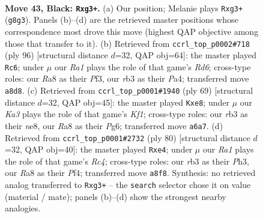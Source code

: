 \documentclass[11pt]{article}
\begin{document}
\clearpage

\begin{figure}[p]\centering
\begin{subfigure}{0.46\textwidth}\centering
\resizebox{\linewidth}{!}{%
\newchessgame
\chessboard[
  setfen={r5r1/5p1p/kpQ5/8/3P4/1R4PP/5P2/6K1 b - - 0 43},
  showmover=false,
  pgfstyle=straightmove, color=movearrow, markmove={g8-g3}
]}
\caption{}
\end{subfigure}\hfill
\begin{subfigure}{0.46\textwidth}\centering
\resizebox{\linewidth}{!}{%
\newchessgame
\chessboard[
  setfen={8/8/3RRppk/p6p/P1p5/2P2Pq1/6P1/6K1 w - - 8 49},
  showmover=false,
  pgfstyle=straightmove, color=movearrow, markmove={d6-c6}
]}
\caption{}
\end{subfigure}
\\[4pt]
\begin{subfigure}{0.46\textwidth}\centering
\resizebox{\linewidth}{!}{%
\newchessgame
\chessboard[
  setfen={4Nk2/5p2/5Qpp/8/6P1/4P2P/r2r1P2/6K1 b - - 0 35},
  showmover=false,
  pgfstyle=straightmove, color=movearrow, markmove={f8-e8}
]}
\caption{}
\end{subfigure}\hfill
\begin{subfigure}{0.46\textwidth}\centering
\resizebox{\linewidth}{!}{%
\newchessgame
\chessboard[
  setfen={6k1/p4pp1/2r4p/8/2R1qP2/P6P/6P1/2R4K w - - 0 41},
  showmover=false,
  pgfstyle=straightmove, color=movearrow, markmove={c4-e4}
]}
\caption{}
\end{subfigure}
\caption{\textbf{Move 43, Black: \texttt{Rxg3+}.} (a) Our position; Melanie plays \texttt{Rxg3+} (\texttt{g8g3}). Panels (b)--(d) are the retrieved master positions whose correspondence most drove this move (highest QAP objective among those that transfer to it). (b) Retrieved from \texttt{ccrl\_top\_p0002\#718} (ply 96) [structural distance $d$=32, QAP obj=64]: the master played \texttt{Rc6}; under $\mu$ our \emph{Ra1} plays the role of that game's \emph{Rd6}; cross-type roles: our \emph{R}a8 as their \emph{P}f3, our \emph{r}b3 as their \emph{P}a4; transferred move \texttt{a8d8}. (c) Retrieved from \texttt{ccrl\_top\_p0001\#1940} (ply 69) [structural distance $d$=32, QAP obj=45]: the master played \texttt{Kxe8}; under $\mu$ our \emph{Ka3} plays the role of that game's \emph{Kf1}; cross-type roles: our \emph{r}b3 as their \emph{n}e8, our \emph{R}a8 as their \emph{P}g6; transferred move \texttt{a6a7}. (d) Retrieved from \texttt{ccrl\_top\_p0001\#2732} (ply 80) [structural distance $d$=32, QAP obj=40]: the master played \texttt{Rxe4}; under $\mu$ our \emph{Ra1} plays the role of that game's \emph{Rc4}; cross-type roles: our \emph{r}b3 as their \emph{P}h3, our \emph{R}a8 as their \emph{P}f4; transferred move \texttt{a8f8}. Synthesis: no retrieved analog transferred to \texttt{Rxg3+} -- the \texttt{search} selector chose it on value (material / mate); panels (b)--(d) show the strongest nearby analogies.}
\label{fig:thought-m85}
\end{figure}
\end{document}
